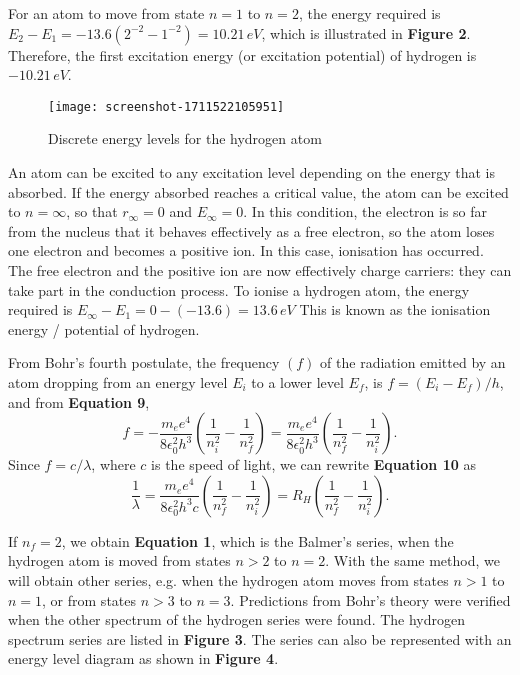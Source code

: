 \documentclass[a4paper,11pt]{article}
\begin{document}
For an atom to move from state $n = 1$ to $n = 2$, the energy required is $E_2 - E_1 = -13.6(2^{-2} - 1^{-2}) = 10.21 \, eV$, which is illustrated in \textbf{Figure 2}. Therefore, the first excitation energy (or excitation potential) of hydrogen is $-10.21 \, eV$.
\newpage
\begin{figure}[h!]
\centering
\texttt{[image: screenshot-1711522105951]}
\caption{Discrete energy levels for the hydrogen atom}
\label{11}
\end{figure}
An atom can be excited to any excitation level depending on the energy that is absorbed. If the energy absorbed reaches a critical value, the atom can be excited to $n = \infty$, so that $r_\infty = 0$ and $E_\infty = 0$. In this condition, the electron is so far from the nucleus that it behaves effectively as a free electron, so the atom loses one electron and becomes a positive ion. In this case, ionisation has occurred. The free electron and the positive ion are now effectively charge carriers: they can take part in the conduction process. To ionise a hydrogen atom, the energy required is $E_\infty - E_1 = 0 - (-13.6) = 13.6 \, eV$ This is known as the ionisation energy / potential of hydrogen.

From Bohr's fourth postulate, the frequency $(f)$ of the radiation emitted by an atom dropping from an energy level $E_i$ to a lower level $E_f$, is $f = (E_i - E_f)/h$, and from \textbf{Equation 9},
\begin{equation}
f = - \frac{m_e e^4}{8 \epsilon_0^2 h^3} \left( \frac{1}{n_i^2} - \frac{1}{n_f^2} \right) = \frac{m_e e^4}{8 \epsilon_0^2 h^3} \left( \frac{1}{n_f^2} - \frac{1}{n_i^2} \right).
\end{equation}
Since $f = c/\lambda$, where $c$ is the speed of light, we can rewrite \textbf{Equation 10} as
\begin{equation}
\frac{1}{\lambda} = \frac{m_e e^4}{8 \epsilon_0^2 h^3 c} \left( \frac{1}{n_f^2} - \frac{1}{n_i^2} \right) = R_H \left( \frac{1}{n_f^2} - \frac{1}{n_i^2} \right).
\end{equation}

If $n_f = 2$, we obtain \textbf{Equation 1}, which is the Balmer's series, when the hydrogen atom is moved from states $n > 2$ to $n = 2$. With the same method, we will obtain other series, e.g. when the hydrogen atom moves from states $n > 1$ to $n = 1$, or from states $n > 3$ to $n = 3$. Predictions from Bohr's theory were verified when the other spectrum of the hydrogen series were found. The hydrogen spectrum series are listed in \textbf{Figure 3}. The series can also be represented with an energy level diagram as shown in \textbf{Figure 4}.\\
\end{document}
